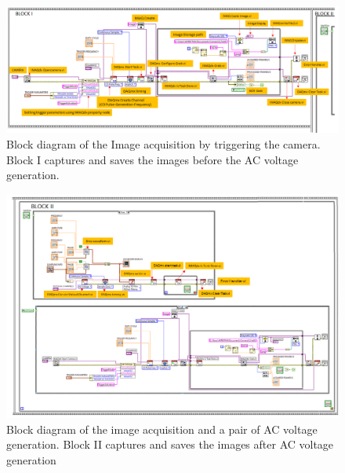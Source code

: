 \documentclass[journal=jacsat,manuscript=article]{achemso}
\begin{document}
\begin{figure}[H]
    \centering
    \includegraphics[width=1.3\textwidth,angle=90]{BLOCK1.png}
    \caption{Block diagram of the Image acquisition by triggering the
      camera. Block I captures and saves the images before the AC
      voltage generation.}
    \label{fig:ex8}
\end{figure}
\begin{figure}[H]
    \centering
    \includegraphics[width=1.3\linewidth, angle=90]{cpef_block2.png}
    \caption{Block diagram of the image acquisition and a pair of AC
      voltage generation. Block II captures and saves the images after
      AC voltage generation}
    \label{fig:ex9}
\end{figure}
\end{document}
